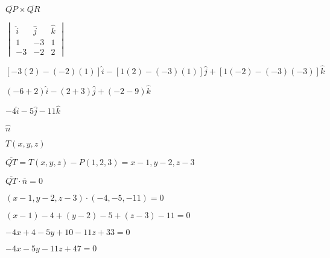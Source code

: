 \documentclass{article}
\def\lthtmlcheckvsize{\ifdim\ht\sizebox<\vsize 
  \ifdim\wd\sizebox<\hsize\expandafter\hfill\fi \expandafter\vfill
  \else\expandafter\vss\fi}%
\begin{document}
{\newpage\clearpage
{}%
$ \overline{QP} \times \overline{QR}$%
\lthtmlindisplaymathZ
\lthtmlcheckvsize\clearpage}

{\newpage\clearpage
{}%
$ \begin{vmatrix} 
\hat i & \hat j & \hat k\\
1 & -3 & 1\\
-3 & -2 & 2
\end{vmatrix}$%
\lthtmlindisplaymathZ
\lthtmlcheckvsize\clearpage}

{\newpage\clearpage
{}%
$ [-3(2)-(-2)(1)]\hat i-[1(2)-(-3)(1)]\hat j+[1(-2)-(-3)(-3)]\hat k$%
\lthtmlindisplaymathZ
\lthtmlcheckvsize\clearpage}

{\newpage\clearpage
{}%
$ (-6+2)\hat i-(2+3)\hat j+(-2-9)\hat k$%
\lthtmlindisplaymathZ
\lthtmlcheckvsize\clearpage}

{\newpage\clearpage
{}%
$ -4\hat i-5\hat j-11\hat k$%
\lthtmlindisplaymathZ
\lthtmlcheckvsize\clearpage}

{\newpage\clearpage
{}%
$ \hat n$%
\lthtmlindisplaymathZ
\lthtmlcheckvsize\clearpage}

{\newpage\clearpage
{}%
$ T(x,y,z)$%
\lthtmlindisplaymathZ
\lthtmlcheckvsize\clearpage}

{\newpage\clearpage
{}%
$ \overline{QT}=T(x,y,z)-P(1,2,3)=x-1,y-2,z-3$%
\lthtmlindisplaymathZ
\lthtmlcheckvsize\clearpage}

{\newpage\clearpage
{}%
$ \overline{QT}\cdot \overline{n}= 0$%
\lthtmlindisplaymathZ
\lthtmlcheckvsize\clearpage}

{\newpage\clearpage
{}%
$ (x-1,y-2,z-3) \cdot (-4,-5,-11)=0$%
\lthtmlindisplaymathZ
\lthtmlcheckvsize\clearpage}

{\newpage\clearpage
{}%
$ (x-1)-4+(y-2)-5+(z-3)-11=0$%
\lthtmlindisplaymathZ
\lthtmlcheckvsize\clearpage}

{\newpage\clearpage
{}%
$ -4x+4-5y+10-11z+33=0$%
\lthtmlindisplaymathZ
\lthtmlcheckvsize\clearpage}

{\newpage\clearpage
{}%
$ -4x-5y-11z+47=0$%
\lthtmlindisplaymathZ
\lthtmlcheckvsize\clearpage}
\end{document}
